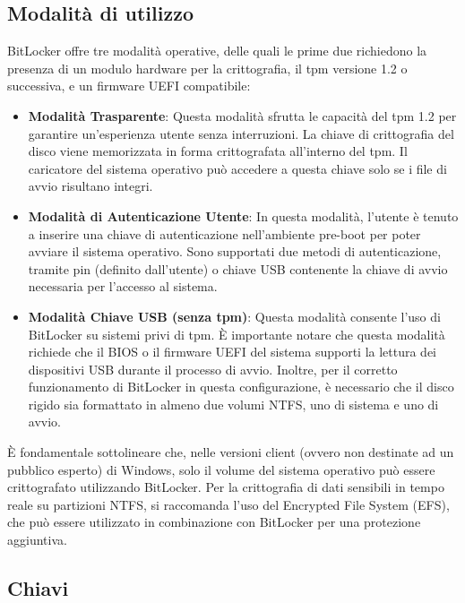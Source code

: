 \subsection{Modalità di utilizzo}\label{subsec:modalita_di_utilizzo}

BitLocker offre tre modalità operative, delle quali le prime due richiedono la presenza di un modulo hardware per la crittografia, il \acrshort{tpm} versione 1.2 o successiva, e un firmware UEFI compatibile:
\begin{itemize}
    \item \textbf{Modalità Trasparente}: Questa modalità sfrutta le capacità del \acrshort{tpm} 1.2 per garantire un'esperienza utente senza interruzioni. La chiave di crittografia del disco viene memorizzata in forma crittografata all'interno del \acrshort{tpm}. Il caricatore del sistema operativo può accedere a questa chiave solo se i file di avvio risultano integri.
    \item \textbf{Modalità di Autenticazione Utente}: In questa modalità, l'utente è tenuto a inserire una chiave di autenticazione nell'ambiente pre-boot per poter avviare il sistema operativo. Sono supportati due metodi di autenticazione, tramite \acrshort{pin} (definito dall’utente) o chiave USB contenente la chiave di avvio necessaria per l'accesso al sistema.
    \item \textbf{Modalità Chiave USB (senza \acrshort{tpm})}: Questa modalità consente l'uso di BitLocker su sistemi privi di \acrshort{tpm}. È importante notare che questa modalità richiede che il BIOS o il firmware UEFI del sistema supporti la lettura dei dispositivi USB durante il processo di avvio. Inoltre, per il corretto funzionamento di BitLocker in questa configurazione, è necessario che il disco rigido sia formattato in almeno due volumi NTFS, uno di sistema e uno di avvio.
\end{itemize}

È fondamentale sottolineare che, nelle versioni client (ovvero non destinate ad un pubblico esperto) di Windows, solo il volume del sistema operativo può essere crittografato utilizzando BitLocker. Per la crittografia di dati sensibili in tempo reale su partizioni NTFS, si raccomanda l'uso del Encrypted File System (EFS), che può essere utilizzato in combinazione con BitLocker per una protezione aggiuntiva.

\subsection{Chiavi}\label{subsec:chiavi}

